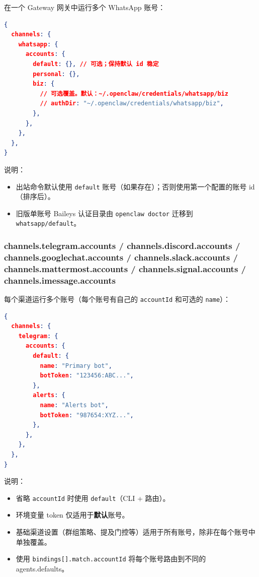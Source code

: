 在一个 Gateway 网关中运行多个 WhatsApp 账号：

\begin{lstlisting}[language=json]
{
  channels: {
    whatsapp: {
      accounts: {
        default: {}, // 可选；保持默认 id 稳定
        personal: {},
        biz: {
          // 可选覆盖。默认：~/.openclaw/credentials/whatsapp/biz
          // authDir: "~/.openclaw/credentials/whatsapp/biz",
        },
      },
    },
  },
}
\end{lstlisting}


说明：

\begin{itemize}
  \item 出站命令默认使用 \texttt{default} 账号（如果存在）；否则使用第一个配置的账号 id（排序后）。
  \item 旧版单账号 Baileys 认证目录由 \texttt{openclaw doctor} 迁移到 \texttt{whatsapp/default}。
\end{itemize}


\subsubsection{channels.telegram.accounts / channels.discord.accounts / channels.googlechat.accounts / channels.slack.accounts / channels.mattermost.accounts / channels.signal.accounts / channels.imessage.accounts}


每个渠道运行多个账号（每个账号有自己的 \texttt{accountId} 和可选的 \texttt{name}）：

\begin{lstlisting}[language=json]
{
  channels: {
    telegram: {
      accounts: {
        default: {
          name: "Primary bot",
          botToken: "123456:ABC...",
        },
        alerts: {
          name: "Alerts bot",
          botToken: "987654:XYZ...",
        },
      },
    },
  },
}
\end{lstlisting}


说明：

\begin{itemize}
  \item 省略 \texttt{accountId} 时使用 \texttt{default}（CLI + 路由）。
  \item 环境变量 token 仅适用于\textbf{默认}账号。
  \item 基础渠道设置（群组策略、提及门控等）适用于所有账号，除非在每个账号中单独覆盖。
  \item 使用 \texttt{bindings[].match.accountId} 将每个账号路由到不同的 agents.defaults。
\end{itemize}


